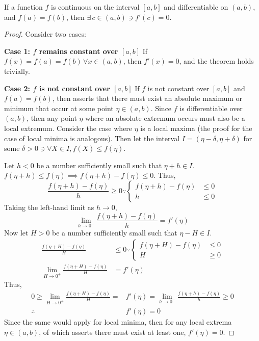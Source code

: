 \begin{lemma}\label{lemma:ROLLES}
	If a function $f$ is continuous on the interval $[a,b]$ and differentiable on $(a,b)$, and $f(a)=f(b)$, then $\exists\,c\in(a,b)\ni f'(c)=0$.
	\begin{proof}
		Consider two cases:
		
		\textbf{Case 1: $f$ remains constant over $[a,b]$}\newline
		If $f(x)=f(a)=f(b)\,\forall x\in(a,b)$, then $f'(x)=0$, and the theorem holds trivially. 
		
		\textbf{Case 2: $f$ is not constant over $[a,b]$}\newline
		If $f$ is not constant over $[a,b]$ and $f(a)=f(b)$, then  asserts that there must exist an absolute maximum
		or minimum that occur at some point $\eta\in(a,b)$. Since $f$ is differentiable over $(a,b)$, then any point $\eta$ where an absolute
		extremum occurs must also be a local extremum. Consider the case where $\eta$ is a local maxima (the proof for the case of local minima
		is analogous). Then let the interval $I=(\eta-\delta,\eta+\delta)$ for some $\delta>0\ni\forall X\in I,f(X)\leq f(\eta)$.

		Let $h<0$ be a number sufficiently small such that $\eta+h\in I$. $f(\eta+h)\leq f(\eta)\implies f(\eta+h)-f(\eta)\leq0$. Thus,
		$$
			\frac{f(\eta+h)-f(\eta)}{h}\geq0\because\left\{\begin{matrix}
				f(\eta+h)-f(\eta)&\leq0\\
				h&\leq0
			\end{matrix}\right.
		$$
		Taking the left-hand limit as $h\rightarrow0$,
		$$
			\lim_{h\rightarrow0^-}\frac{f(\eta+h)-f(\eta)}{h}=f'(\eta)
		$$
		Now let $H>0$ be a number sufficiently small such that $\eta-H\in I$.
		\begin{align*}
			\frac{f(\eta+H)-f(\eta)}{H}&\leq0\because\left\{\begin{matrix}
				f(\eta+H)-f(\eta)&\leq0\\
				H&\geq0
			\end{matrix}\right.\\
			\lim_{H\rightarrow0^+}\frac{f(\eta+H)-f(\eta)}{H}&=f'(\eta)
		\end{align*}
		Thus,
		\begin{align*}
			0\geq\lim_{H\rightarrow0^+}\frac{f(\eta+H)-f(\eta)}{H}=&f'(\eta)=\lim_{h\rightarrow0^-}\frac{f(\eta+h)-f(\eta)}{h}\geq0\\
			\therefore\,&f'(\eta)=0
		\end{align*}
		Since the same would apply for local minima, then for any local extrema $\eta\in(a,b)$, of which  asserts
		there must exist at least one, $f'(\eta)=0$.
	\end{proof}
\end{lemma}
